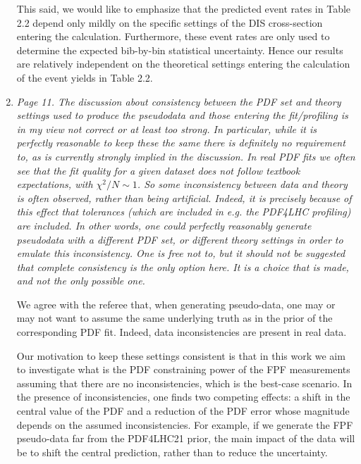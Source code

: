 \documentclass[11pt,a4paper]{article}
\begin{document}
\begin{enumerate}
        This said, we would like to emphasize that the predicted event rates in Table 2.2 depend
        only mildly on the specific settings of the DIS cross-section entering the calculation.
        Furthermore, these event rates are only used to determine the expected bib-by-bin
        statistical uncertainty.
        Hence our results are relatively independent on the theoretical settings
        entering the calculation of the event yields in Table 2.2.
	
	\item {\it Page 11. The discussion about consistency between the PDF set and theory settings
		used to produce the pseudodata and those entering the fit/profiling is in my view not
		correct or at least too strong. In particular, while it is perfectly reasonable to keep
		these the same there is definitely no requirement to, as is currently strongly implied in
		the discussion. In real PDF fits we often see that the fit quality for a given dataset does
		not follow textbook expectations, with $\chi^2/N \sim 1$. So some inconsistency between data
		and theory is often observed, rather than being artificial. Indeed, it is precisely because
		of this effect that tolerances (which are included in e.g. the PDF4LHC profiling) are
		included. In other words, one could perfectly reasonably generate pseudodata with a
		different PDF set, or different theory settings in order to emulate this inconsistency.
		One is free not to, but it should not be suggested that complete consistency is the only
		option here. It is a choice that is made, and not the only possible one.
	}
	
          We agree with the referee that, when generating pseudo-data, one may or may not want to
          assume the same underlying truth as in the prior of the corresponding PDF fit.
          Indeed, data inconsistencies are present in real data.
          
          Our motivation to keep these settings consistent is that in this work we aim to investigate
          what is the PDF constraining power of the FPF measurements
          assuming that there are no inconsistencies,
          which is the best-case scenario.
          In the presence of inconsistencies, one finds two competing effects: a shift in the central value
          of the PDF and a reduction of the PDF error whose magnitude depends on the assumed
          inconsistencies.
          For example, if we generate the FPF pseudo-data far from the PDF4LHC21 prior,
          the main impact of the data will be to shift the central prediction, rather than
          to reduce the uncertainty.


\end{enumerate}
\end{document}
